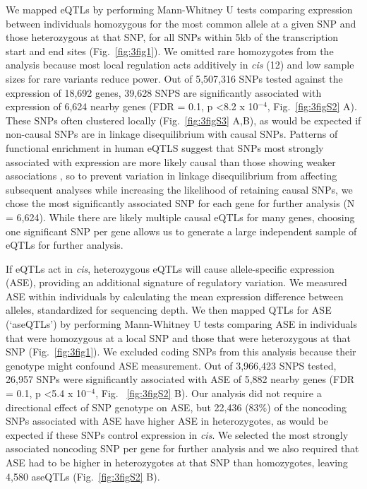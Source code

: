 We mapped eQTLs by performing Mann-Whitney U tests comparing expression between individuals homozygous for the most common allele at a given SNP and those heterozygous at that SNP, for all SNPs within 5kb of the transcription start and end sites (Fig.~\ref{fig:3fig1}). We omitted rare homozygotes from the analysis because most local regulation acts additively in \textit{cis} (12) and low sample sizes for rare variants reduce power. Out of 5,507,316 SNPs tested against the expression of 18,692 genes, 39,628 SNPS are significantly associated with expression of 6,624 nearby genes (FDR = 0.1, p \textless 8.2 x 10$^{-4}$, Fig.~\ref{fig:3figS2} A). These SNPs often clustered locally (Fig.~\ref{fig:3figS3} A,B), as would be expected if non-causal SNPs are in linkage disequilibrium with causal SNPs. Patterns of functional enrichment in human eQTLS suggest that SNPs most strongly associated with expression are more likely causal than those showing weaker associations \citep{Lappalainen2013-jh}, so to prevent variation in linkage disequilibrium from affecting subsequent analyses while increasing the likelihood of retaining causal SNPs, we chose the most significantly associated SNP for each gene for further analysis (N = 6,624). While there are likely multiple causal eQTLs for many genes, choosing one significant SNP per gene allows us to generate a large independent sample of eQTLs for further analysis.

If eQTLs act in \textit{cis}, heterozygous eQTLs will cause allele-specific expression (ASE), providing an additional signature of regulatory variation. We measured ASE within individuals by calculating the mean expression difference between alleles, standardized for sequencing depth. We then mapped QTLs for ASE (‘aseQTLs’) by performing Mann-Whitney U tests comparing ASE in individuals that were homozygous at a local SNP and those that were heterozygous at that SNP (Fig.~\ref{fig:3fig1}). We excluded coding SNPs from this analysis because their genotype might confound ASE measurement. Out of 3,966,423 SNPS tested, 26,957 SNPs were significantly associated with ASE of 5,882 nearby genes (FDR = 0.1, p \textless 5.4 x 10$^{-4}$, Fig. ~\ref{fig:3figS2} B). Our analysis did not require a directional effect of SNP genotype on ASE, but 22,436 (83\%) of the noncoding SNPs associated with ASE have higher ASE in heterozygotes, as would be expected if these SNPs control expression in \textit{cis}. We selected the most strongly associated noncoding SNP per gene for further analysis and we also required that ASE had to be higher in heterozygotes at that SNP than homozygotes, leaving 4,580 aseQTLs (Fig.~\ref{fig:3figS2} B). 


